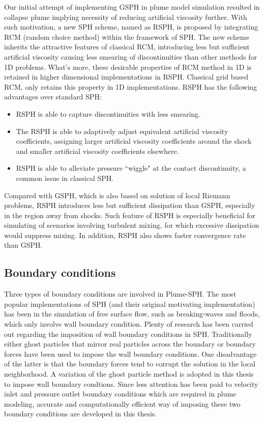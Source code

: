 Our initial attempt of implementing GSPH in plume model simulation resulted in collapse plume implying necessity of reducing artificial viscosity further. With such motivation, a new SPH scheme, named as RSPH, is proposed by integrating RCM (random choice method) within the framework of SPH. 
The new scheme inherits the attractive features  of classical RCM, introducing less but sufficient artificial viscosity causing less smearing of discontinuities than other methods for 1D problems. What's more, these desirable properties of RCM method in 1D is retained in higher dimensional implementations in RSPH. Classical grid based  RCM,  only retains this property in  1D implementations. 
RSPH has the following advantages over standard SPH:
\begin{itemize}
\item RSPH is able to capture discontinuities with less smearing.
\item The RSPH is able to adaptively adjust equivalent artificial viscosity coefficients, assigning larger artificial viscosity coefficients around the shock and smaller artificial viscosity coefficients elsewhere.
\item RSPH is able to alleviate pressure ``wiggle" at the contact discontinuity, a common issue in classical SPH.
\end{itemize}
Compared with GSPH, which is also based on solution of local Riemann problems, RSPH introduces less but sufficient dissipation than GSPH, especially in the region away from shocks. Such feature of RSPH is especially beneficial for simulating of scenarios involving turbulent mixing, for which excessive dissipation would suppress mixing. In addition, RSPH also shows faster convergence rate than GSPH. 

\subsection{Boundary conditions}
Three types of boundary conditions are involved in Plume-SPH. The most popular implementations of SPH (and their original motivating implementation) has been in the simulation of free surface flow, such as breaking-waves and floods, which only involve wall boundary condition. Plenty of research has been carried out regarding the imposition of wall boundary conditions in SPH. Traditionally either ghost particles that mirror real particles across the boundary \citep {ferrari2009new} or boundary forces \citep {monaghan2009sph} have been used to impose the wall boundary conditions. One disadvantage of the latter  is that the boundary forces tend to corrupt the solution in the local neighborhood. A variation \citep {kumar2013parallel} of the ghost particle method is adopted in this thesis to impose wall boundary condtions. Since less attention has been paid to velocity inlet and pressure outlet boundary conditions which are required in plume modeling, accurate and computationally efficient way of imposing these two boundary conditions are developed in this thesis.

